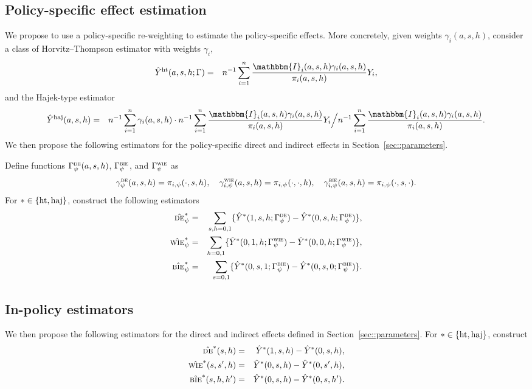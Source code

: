 \documentclass{article}
\newcommand{\sumi}{\sum_{i=1}^n}
\newcommand{\de}{\textsc{de}}
\newcommand{\bie}{\textsc{bie}}
\newcommand{\wie}{\textsc{wie}}
\newcommand{\horthom}{\textup{ht}}
\newcommand{\haj}{\textup{haj}}
\newcommand{\bbI}{\mathbbm{I}}
\newcommand{\pscore}[1]{\pi_{#1}}
\begin{document}
\subsection{Policy-specific effect estimation}
We propose to use a policy-specific re-weighting to estimate the policy-specific effects. More concretely, given weights $\gamma_i(a,s,h)$, consider a class of Horvitz--Thompson estimator with weights $\gamma_i$,
\begin{eqnarray*}
    \hat{Y}^{\horthom}(a,s,h;\Gamma) &=& n^{-1}\sumi\frac{ \bbI_{i}(a,s,h)\gamma_i(a,s,h)}{ \pscore{i}(a,s,h)}Y_{i},
\end{eqnarray*}
and the Hajek-type estimator
\begin{eqnarray*}
    \hat{Y}^{\haj}(a,s,h) &=& n^{-1}\sumi \gamma_i(a,s,h)\cdot n^{-1}\sumi\frac{ \bbI_{i}(a,s,h) \gamma_i(a,s,h)}{ \pscore{i}(a,s,h)}Y_{i} \Big / n^{-1}\sumi\frac{ \bbI_{i}(a,s,h) \gamma_i(a,s,h)}{ \pscore{i}(a,s,h)}. 
\end{eqnarray*}
We then propose the following estimators for the policy-specific direct and indirect effects in Section~\ref{sec::parameters}. 

Define functions $\Gamma_{\psi}^{\de}(a,s,h)$, $\Gamma_{\psi}^{\bie}$, and $\Gamma_{\psi}^{\wie}$ as
\begin{equation*}
    \gamma_{\psi}^{\de}(a,s,h) = \pscore{i,\psi}(\cdot,s,h), \quad 
    \gamma_{i,\psi}^{\wie}(a,s,h) = \pscore{i,\psi}(\cdot, \cdot, h), \quad
    \gamma_{i,\psi}^{\bie}(a,s,h) = \pscore{i,\psi}(\cdot, s, \cdot).
\end{equation*}
For $*\in\{\horthom,\haj\}$, construct the following estimators
\begin{eqnarray*}
    \hat{\de}_{\psi}^{*} &=& \sum_{s,h=0,1} \{\hat{Y}^{*}(1,s,h;\Gamma_{\psi}^{\de})  - \hat{Y}^{*}(0,s,h;\Gamma_{\psi}^{\de})\}, \\
    \hat{\wie}_{\psi}^{*} &=& \sum_{h=0,1} \{\hat{Y}^{*}(0,1,h;\Gamma_{\psi}^{\wie}) - \hat{Y}^{*}(0,0,h;\Gamma_{\psi}^{\wie})\}, \\
    \hat{\bie}_{\psi}^{*} &=& \sum_{s=0,1} \{\hat{Y}^{*}(0,s,1;\Gamma_{\psi}^{\bie}) - \hat{Y}^{*}(0,s,0;\Gamma_{\psi}^{\bie})\}.
\end{eqnarray*}


\subsection{In-policy estimators}

We then propose the following estimators for the direct and indirect effects defined in Section~\ref{sec::parameters}. For $*\in\{\horthom,\haj\}$, construct
\begin{eqnarray*}
    \hat{\de}^{*}(s,h) &=& \hat{Y}^{*}(1,s,h) - \hat{Y}^{*}(0,s,h), \\
    \hat{\wie}^{*}(s,s^{\prime},h) &=& \hat{Y}^{*}(0,s,h) - \hat{Y}^{*}(0,s^{\prime},h), \\
    \hat{\bie}^{*}(s,h,h^{\prime}) &=& \hat{Y}^{*}(0,s,h) - \hat{Y}^{*}(0,s,h^{\prime}).
\end{eqnarray*}
\end{document}

